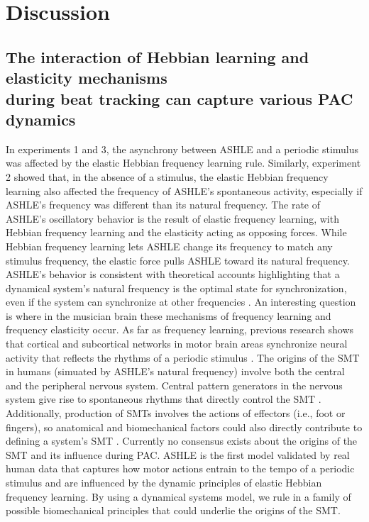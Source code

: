 \documentclass{report}
\begin{document}
\section{Discussion}

\subsection{The interaction of Hebbian learning and elasticity mechanisms \\ during beat tracking can capture various PAC dynamics}

In experiments 1 and 3, the asynchrony between ASHLE and a periodic stimulus was affected by the elastic Hebbian frequency learning rule. Similarly, experiment 2 showed that, in the absence of a stimulus, the elastic Hebbian frequency learning also affected the frequency of ASHLE's spontaneous activity, especially if ASHLE's frequency was different than its natural frequency. The rate of ASHLE's oscillatory behavior is the result of elastic frequency learning, with Hebbian frequency learning and the elasticity acting as opposing forces. While Hebbian frequency learning lets ASHLE change its frequency to match any stimulus frequency, the elastic force pulls ASHLE toward its natural frequency. ASHLE's behavior is consistent with theoretical accounts highlighting that a dynamical system's natural frequency is the optimal state for synchronization, even if the system can synchronize at other frequencies \cite{von1937nature, haken1985theoretical, kelso1997relative, scheurich2018tapping}. An interesting question is where in the musician brain these mechanisms of frequency learning and frequency elasticity occur. As far as frequency learning, previous research shows that cortical and subcortical networks in motor brain areas synchronize neural activity that reflects the rhythms of a periodic stimulus \cite{large2015neural, chen2008moving, grahn2009feeling, fujioka2012internalized}. The origins of the SMT in humans (simuated by ASHLE's natural frequency) involve both the central and the peripheral nervous system. Central pattern generators in the nervous system give rise to spontaneous rhythms that directly control the SMT \cite{latash1992virtual}. Additionally, production of SMTs involves the actions of effectors (i.e., foot or fingers), so anatomical and biomechanical factors could also directly contribute to defining a system's SMT \cite{goodman2000advantages}. Currently no consensus exists about the origins of the SMT and its influence during PAC. ASHLE is the first model validated by real human data that captures how motor actions entrain to the tempo of a periodic stimulus and are influenced by the dynamic principles of elastic Hebbian frequency learning. By using a dynamical systems model, we rule in a family of possible biomechanical principles \cite{bose2019neuromechanistic} that could underlie the origins of the SMT.
\end{document}
